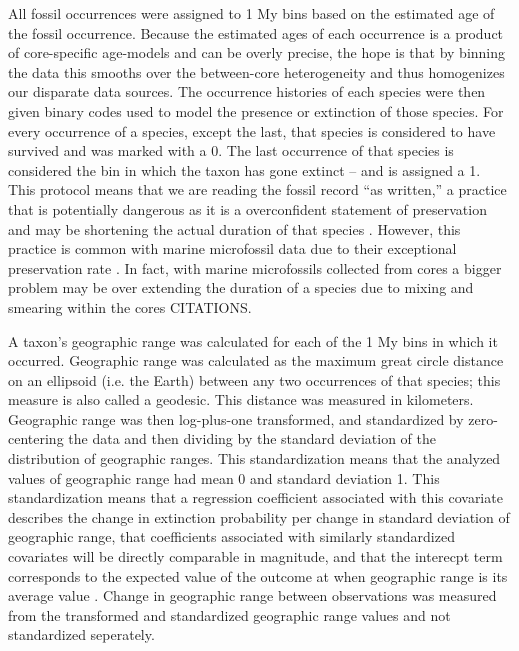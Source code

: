 \documentclass[12pt,letterpaper]{article}
\begin{document}
All fossil occurrences were assigned to 1 My bins based on the estimated age of the fossil occurrence. Because the estimated ages of each occurrence is a product of core-specific age-models and can be overly precise, the hope is that by binning the data this smooths over the between-core heterogeneity and thus homogenizes our disparate data sources. The occurrence histories of each species were then given binary codes used to model the presence or extinction of those species. For every occurrence of a species, except the last, that species is considered to have survived and was marked with a 0. The last occurrence of that species is considered the bin in which the taxon has gone extinct -- and is assigned a 1. This protocol means that we are reading the fossil record ``as written,'' a practice that is potentially dangerous as it is a overconfident statement of preservation and may be shortening the actual duration of that species \citep{Alroy2010,Alroy2000b,Alroy2014,Foote1997,Foote1999a,Foote2001,Foote1996e,Lloyd2012b,Marshall1995,Wang2016}. However, this practice is common with marine microfossil data due to their exceptional preservation rate \citep{Ezard2013,Ezard2016,Ezard2011,Liow2010}. In fact, with marine microfossils collected from cores a bigger problem may be over extending the duration of a species due to mixing and smearing within the cores CITATIONS.

A taxon's geographic range was calculated for each of the 1 My bins in which it occurred. Geographic range was calculated as the maximum great circle distance on an ellipsoid (i.e. the Earth) between any two occurrences of that species; this measure is also called a geodesic. This distance was measured in kilometers. Geographic range was then log-plus-one transformed, and standardized by zero-centering the data and then dividing by the standard deviation of the distribution of geographic ranges. This standardization means that the analyzed values of geographic range had mean 0 and standard deviation 1. This standardization means that a regression coefficient associated with this covariate describes the change in extinction probability per change in standard deviation of geographic range, that coefficients associated with similarly standardized covariates will be directly comparable in magnitude, and that the interecpt term corresponds to the expected value of the outcome at when geographic range is its average value \citep{ARM}. Change in geographic range between observations was measured from the transformed and standardized geographic range values and not standardized seperately.
\end{document}
